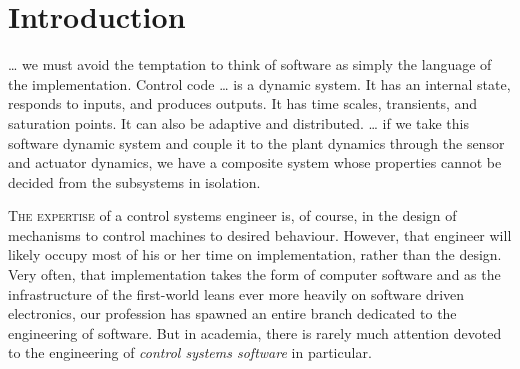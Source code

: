 %
\chapter{Introduction}%
\label{chap:introduction}

\epigraph{
  … we must avoid the temptation to think of software as simply the language of
  the implementation. Control code … is a dynamic system. It has an internal
  state, responds to inputs, and produces outputs. It has time scales,
  transients, and saturation points. It can also be adaptive and distributed. …
  if we take this software dynamic system and couple it to the plant dynamics
  through the sensor and actuator dynamics, we have a composite system whose
  properties cannot be decided from the subsystems in isolation.
}{
}

\lettrine{T}{he expertise} of a control systems engineer is, of course, in the
design of mechanisms to control machines to desired behaviour. However, that
engineer will likely occupy most of his or her time on implementation, rather
than the design. Very often, that implementation takes the form of computer
software and as the infrastructure of the first-world leans ever more heavily on
software driven electronics, our profession has spawned an entire branch
dedicated to the engineering of software. But in academia, there is rarely much
attention devoted to the engineering of \emph{control systems software} in
particular.

